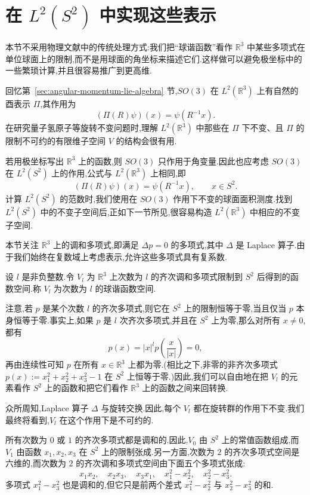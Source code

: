 \section{在 $L^2(S^2)$ 中实现这些表示}
\label{sec:representations-in-l2-sphere}

本节不采用物理文献中的传统处理方式:我们把“球谐函数”看作 $\mathbb R^3$ 中某些多项式在单位球面上的限制,而不是用球面的角坐标来描述它们.这样做可以避免极坐标中的一些繁琐计算,并且很容易推广到更高维.

回忆第~\ref{sec:angular-momentum-lie-algebra} 节,$SO(3)$ 在 $L^2(\mathbb R^3)$ 上有自然的酉表示 $\Pi$,其作用为
\[
 (\Pi(R)\psi)(x)=\psi(R^{-1}x).
\]
在研究量子氢原子等旋转不变问题时,理解 $L^2(\mathbb R^3)$ 中那些在 $\Pi$ 下不变、且 $\Pi$ 的限制不可约的有限维子空间 $V$ 的结构会很有用.

若用极坐标写出 $\mathbb R^3$ 上的函数,则 $SO(3)$ 只作用于角变量.因此也应考虑 $SO(3)$ 在 $L^2(S^2)$ 上的作用,公式与 $L^2(\mathbb R^3)$ 上相同,即
\[
 (\Pi(R)\psi)(x)=\psi(R^{-1}x),\qquad x\in S^2.
\]
计算 $L^2(S^2)$ 的范数时,我们使用在 $SO(3)$ 作用下不变的球面面积测度.找到 $L^2(S^2)$ 中的不变子空间后,正如下一节所见,很容易构造 $L^2(\mathbb R^3)$ 中相应的不变子空间.

本节关注 $\mathbb R^3$ 上的调和多项式,即满足 $\Delta p=0$ 的多项式,其中 $\Delta$ 是 Laplace 算子.由于我们始终在复数域上考虑表示,允许这些多项式具有复系数.

\begin{definition}\label{def:spherical-harmonics-space}
设 $l$ 是非负整数.令 $V_l$ 为 $\mathbb R^3$ 上次数为 $l$ 的齐次调和多项式限制到 $S^2$ 后得到的函数空间.称 $V_l$ 为次数为 $l$ 的球谐函数空间.
\end{definition}

注意,若 $p$ 是某个次数 $l$ 的齐次多项式,则它在 $S^2$ 上的限制恒等于零,当且仅当 $p$ 本身恒等于零.事实上,如果 $p$ 是 $l$ 次齐次多项式,并且在 $S^2$ 上为零,那么对所有 $x\neq0$,都有
\[
 p(x)=|x|^l p\left(\frac{x}{|x|}\right)=0,
\]
再由连续性可知 $p$ 在所有 $x\in\mathbb R^3$ 上都为零.(相比之下,非零的非齐次多项式 $p(x):=x_1^2+x_2^2+x_3^2-1$ 在 $S^2$ 上恒等于零.)因此,我们可以自由地在把 $V_l$ 的元素看作 $S^2$ 上的函数和把它们看作 $\mathbb R^3$ 上的函数之间来回转换.

众所周知,Laplace 算子 $\Delta$ 与旋转交换.因此,每个 $V_l$ 都在旋转群的作用下不变.我们最终将看到,$V_l$ 在这个作用下是不可约的.

所有次数为 $0$ 或 $1$ 的齐次多项式都是调和的.因此,$V_0$ 由 $S^2$ 上的常值函数组成,而 $V_1$ 由函数 $x_1,x_2,x_3$ 在 $S^2$ 上的限制张成.另一方面,次数为 $2$ 的齐次多项式空间是六维的,而次数为 $2$ 的齐次调和多项式空间由下面五个多项式张成:
\[
 x_1x_2,\quad x_2x_3,\quad x_3x_1,\quad x_1^2-x_2^2,\quad x_2^2-x_3^2.
\]
多项式 $x_1^2-x_3^2$ 也是调和的,但它只是前两个差式 $x_1^2-x_2^2$ 与 $x_2^2-x_3^2$ 的和.

